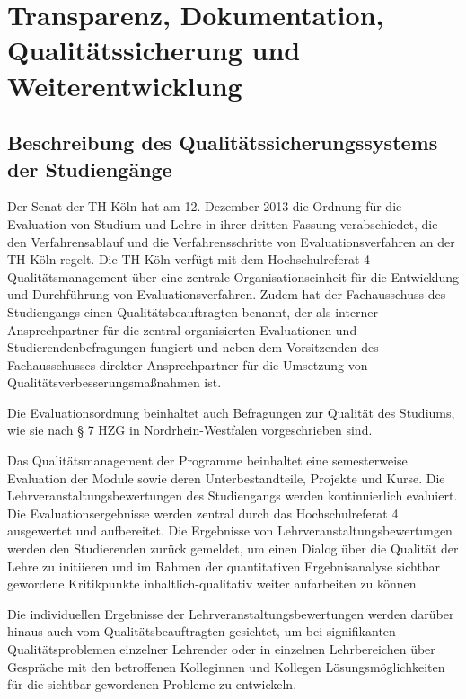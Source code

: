 \chapter{Transparenz, Dokumentation, Qualitätssicherung und
Weiterentwicklung}\label{transparenz-dokumentation-qualituxe4tssicherung-und-weiterentwicklung}

\section{Beschreibung des Qualitätssicherungssystems der
Studiengänge}\label{beschreibung-des-qualituxe4tssicherungssystems-der-studienguxe4nge}

Der Senat der TH Köln hat am 12. Dezember 2013 die Ordnung für die
Evaluation von Studium und Lehre in ihrer dritten Fassung verabschiedet,
die den Verfahrensablauf und die Verfahrensschritte von
Evaluationsverfahren an der TH Köln regelt. Die TH Köln verfügt mit dem
Hochschulreferat 4 Qualitätsmanagement über eine zentrale
Organisationseinheit für die Entwicklung und Durchführung von
Evaluationsverfahren. Zudem hat der Fachausschuss des Studiengangs einen
Qualitätsbeauftragten benannt, der als interner Ansprechpartner für die
zentral organisierten Evaluationen und Studierendenbefragungen fungiert
und neben dem Vorsitzenden des Fachausschusses direkter Ansprechpartner
für die Umsetzung von Qualitätsverbesserungsmaßnahmen ist.

Die Evaluationsordnung beinhaltet auch Befragungen zur Qualität des
Studiums, wie sie nach § 7 HZG in Nordrhein-Westfalen vorgeschrieben
sind.

Das Qualitätsmanagement der Programme beinhaltet eine semesterweise
Evaluation der Module sowie deren Unterbestandteile, Projekte und Kurse.
Die Lehrveranstaltungsbewertungen des Studiengangs werden kontinuierlich
evaluiert. Die Evaluationsergebnisse werden zentral durch das
Hochschulreferat 4 ausgewertet und aufbereitet. Die Ergebnisse von
Lehrveranstaltungsbewertungen werden den Studierenden zurück gemeldet,
um einen Dialog über die Qualität der Lehre zu initiieren und im Rahmen
der quantitativen Ergebnisanalyse sichtbar gewordene Kritikpunkte
inhaltlich-qualitativ weiter aufarbeiten zu können.

Die individuellen Ergebnisse der Lehrveranstaltungsbewertungen werden
darüber hinaus auch vom Qualitätsbeauftragten gesichtet, um bei
signifikanten Qualitätsproblemen einzelner Lehrender oder in einzelnen
Lehrbereichen über Gespräche mit den betroffenen Kolleginnen und
Kollegen Lösungsmöglichkeiten für die sichtbar gewordenen Probleme zu
entwickeln.

